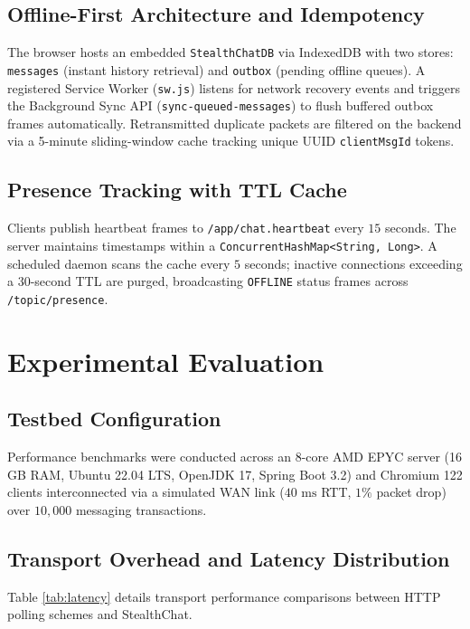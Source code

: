 \documentclass[conference]{IEEEtran}
\begin{document}
\subsection{Offline-First Architecture and Idempotency}
The browser hosts an embedded \texttt{StealthChatDB} via IndexedDB with two stores: \texttt{messages} (instant history retrieval) and \texttt{outbox} (pending offline queues). A registered Service Worker (\texttt{sw.js}) listens for network recovery events and triggers the Background Sync API (\texttt{sync-queued-messages}) to flush buffered outbox frames automatically. Retransmitted duplicate packets are filtered on the backend via a 5-minute sliding-window cache tracking unique UUID \texttt{clientMsgId} tokens.

\subsection{Presence Tracking with TTL Cache}
Clients publish heartbeat frames to \texttt{/app/chat.heartbeat} every $15$ seconds. The server maintains timestamps within a \texttt{ConcurrentHashMap<String, Long>}. A scheduled daemon scans the cache every $5$ seconds; inactive connections exceeding a $30$-second TTL are purged, broadcasting \texttt{OFFLINE} status frames across \texttt{/topic/presence}.

\section{Experimental Evaluation}

\subsection{Testbed Configuration}
Performance benchmarks were conducted across an 8-core AMD EPYC server (16 GB RAM, Ubuntu 22.04 LTS, OpenJDK 17, Spring Boot 3.2) and Chromium 122 clients interconnected via a simulated WAN link ($40\text{ ms}$ RTT, $1\%$ packet drop) over $10{,}000$ messaging transactions.

\subsection{Transport Overhead and Latency Distribution}
Table \ref{tab:latency} details transport performance comparisons between HTTP polling schemes and StealthChat.
\end{document}
